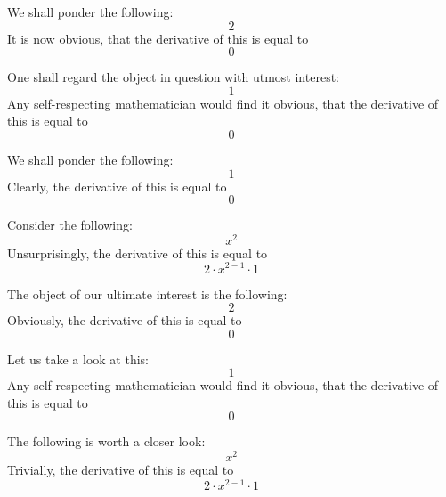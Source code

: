 \documentclass{article}
\begin{document}
We shall ponder the following:
\begin{equation}
2 
\end{equation}
It is now obvious, that the derivative of this is equal to
\begin{equation}
0 
\end{equation}

One shall regard the object in question with utmost interest:
\begin{equation}
1 
\end{equation}
Any self-respecting mathematician would find it obvious, that the derivative of this is equal to
\begin{equation}
0 
\end{equation}

We shall ponder the following:
\begin{equation}
1 
\end{equation}
Clearly, the derivative of this is equal to
\begin{equation}
0 
\end{equation}

Consider the following:
\begin{equation}
x ^{2 } 
\end{equation}
Unsurprisingly, the derivative of this is equal to
\begin{equation}
2 \cdot x ^{2 - 1 } \cdot 1 
\end{equation}

The object of our ultimate interest is the following:
\begin{equation}
2 
\end{equation}
Obviously, the derivative of this is equal to
\begin{equation}
0 
\end{equation}

Let us take a look at this:
\begin{equation}
1 
\end{equation}
Any self-respecting mathematician would find it obvious, that the derivative of this is equal to
\begin{equation}
0 
\end{equation}

The following is worth a closer look:
\begin{equation}
x ^{2 } 
\end{equation}
Trivially, the derivative of this is equal to
\begin{equation}
2 \cdot x ^{2 - 1 } \cdot 1 
\end{equation}
\end{document}
